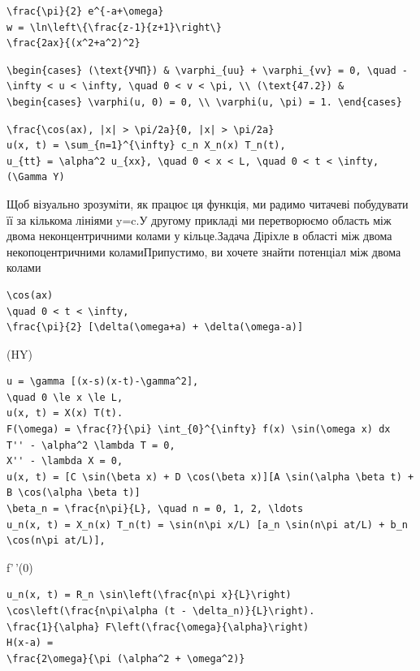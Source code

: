 \documentclass[
  ukrainian,
]{article}
\begin{document}
\begin{verbatim}
\frac{\pi}{2} e^{-a+\omega}
w = \ln\left\{\frac{z-1}{z+1}\right\}
\frac{2ax}{(x^2+a^2)^2}
\end{verbatim}

\begin{verbatim}
\begin{cases} (\text{УЧП}) & \varphi_{uu} + \varphi_{vv} = 0, \quad -\infty < u < \infty, \quad 0 < v < \pi, \\ (\text{47.2}) & \begin{cases} \varphi(u, 0) = 0, \\ \varphi(u, \pi) = 1. \end{cases}
\end{verbatim}

\begin{verbatim}
\frac{\cos(ax), |x| > \pi/2a}{0, |x| > \pi/2a}
u(x, t) = \sum_{n=1}^{\infty} c_n X_n(x) T_n(t),
u_{tt} = \alpha^2 u_{xx}, \quad 0 < x < L, \quad 0 < t < \infty,
(\Gamma Y)
\end{verbatim}

Щоб візуально зрозуміти, як працює ця функція, ми радимо читачеві
побудувати її за кількома лініями y=c.У другому прикладі ми перетворюємо
область між двома неконцентричними колами у кільце.Задача Діріхле в
області між двома некопоцентричними коламиПрипустимо, ви хочете знайти
потенціал між двома колами

\begin{verbatim}
\cos(ax)
\quad 0 < t < \infty,
\frac{\pi}{2} [\delta(\omega+a) + \delta(\omega-a)]
\end{verbatim}

(HY)

\begin{verbatim}
u = \gamma [(x-s)(x-t)-\gamma^2],
\quad 0 \le x \le L,
u(x, t) = X(x) T(t).
F(\omega) = \frac{?}{\pi} \int_{0}^{\infty} f(x) \sin(\omega x) dx
T'' - \alpha^2 \lambda T = 0,
X'' - \lambda X = 0,
u(x, t) = [C \sin(\beta x) + D \cos(\beta x)][A \sin(\alpha \beta t) + B \cos(\alpha \beta t)]
\beta_n = \frac{n\pi}{L}, \quad n = 0, 1, 2, \ldots
u_n(x, t) = X_n(x) T_n(t) = \sin(n\pi x/L) [a_n \sin(n\pi at/L) + b_n \cos(n\pi at/L)],
\end{verbatim}

f'\,'(0)

\begin{verbatim}
u_n(x, t) = R_n \sin\left(\frac{n\pi x}{L}\right) \cos\left(\frac{n\pi\alpha (t - \delta_n)}{L}\right).
\frac{1}{\alpha} F\left(\frac{\omega}{\alpha}\right)
H(x-a) =
\frac{2\omega}{\pi (\alpha^2 + \omega^2)}
\end{verbatim}
\end{document}
